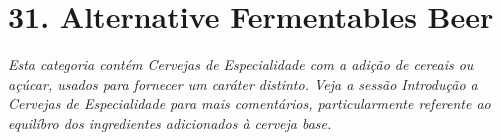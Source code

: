 \section*{31. Alternative Fermentables Beer}

\textit{Esta categoria contém Cervejas de Especialidade com a adição de cereais ou açúcar, usados para fornecer um caráter distinto. Veja a sessão Introdução a Cervejas de Especialidade para mais comentários, particularmente referente ao equilíbro dos ingredientes adicionados à cerveja base.}

